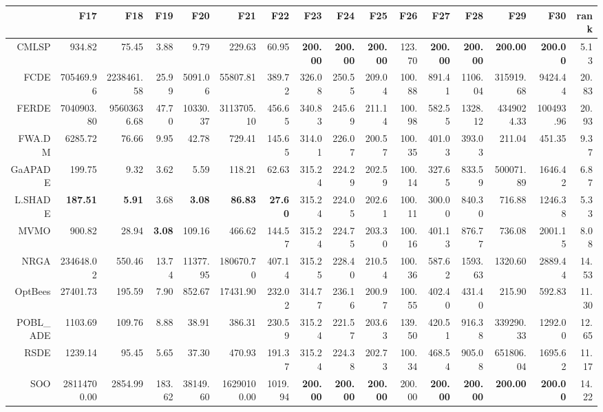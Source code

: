 \begin{table}[h!]
\centering
\begingroup\tiny
\begin{tabular}{rrrrrrrrrrrrrrrr}
  \hline
 & F17 & F18 & F19 & F20 & F21 & F22 & F23 & F24 & F25 & F26 & F27 & F28 & F29 & F30 & rank \\ 
  \hline
CMLSP & 934.82 & 75.45 & 3.88 & 9.79 & 229.63 & 60.95 & \textbf{200.00} & \textbf{200.00} & \textbf{200.00} & 123.70 & \textbf{200.00} & \textbf{200.00} & \textbf{200.00} & \textbf{200.00} & 5.13 \\ 
  FCDE & 705469.96 & 2238461.58 & 25.99 & 5091.06 & 55807.81 & 389.72 & 326.08 & 250.55 & 209.04 & 100.88 & 891.41 & 1106.04 & 315919.68 & 9424.44 & 20.83 \\ 
  FERDE & 7040903.80 & 95603636.68 & 47.70 & 10330.37 & 3113705.10 & 456.65 & 340.83 & 245.69 & 211.14 & 100.98 & 582.55 & 1328.12 & 4349024.33 & 100493.96 & 20.93 \\ 
  FWA.DM & 6285.72 & 76.66 & 9.95 & 42.78 & 729.41 & 145.65 & 314.01 & 226.07 & 200.57 & 100.35 & 401.03 & 393.03 & 211.04 & 451.35 & 9.37 \\ 
  GaAPADE & 199.75 & 9.32 & 3.62 & 5.59 & 118.21 & 62.63 & 315.24 & 224.29 & 202.59 & 100.14 & 327.65 & 833.59 & 500071.89 & 1646.42 & 6.87 \\ 
  L.SHADE & \textbf{187.51} & \textbf{5.91} & 3.68 & \textbf{3.08} & \textbf{86.83} & \textbf{27.60} & 315.24 & 224.05 & 202.61 & 100.11 & 300.00 & 840.30 & 716.88 & 1246.38 & 5.33 \\ 
  MVMO & 900.82 & 28.94 & \textbf{3.08} & 109.16 & 466.62 & 144.57 & 315.24 & 224.75 & 203.30 & 100.16 & 401.13 & 876.77 & 736.08 & 2001.15 & 8.08 \\ 
  NRGA & 234648.02 & 550.46 & 13.74 & 11377.95 & 180670.70 & 407.14 & 315.25 & 228.40 & 210.54 & 100.36 & 587.62 & 1593.63 & 1320.60 & 2889.44 & 14.53 \\ 
  OptBees & 27401.73 & 195.59 & 7.90 & 852.67 & 17431.90 & 232.02 & 314.77 & 236.16 & 200.97 & 100.55 & 402.40 & 431.40 & 215.90 & 592.83 & 11.30 \\ 
  POBL\_ADE & 1103.69 & 109.76 & 8.88 & 38.91 & 386.31 & 230.59 & 315.24 & 221.57 & 203.63 & 139.50 & 420.51 & 916.38 & 339290.33 & 1292.00 & 12.65 \\ 
  RSDE & 1239.14 & 95.45 & 5.65 & 37.30 & 470.93 & 191.37 & 315.24 & 224.38 & 202.73 & 100.34 & 468.54 & 905.08 & 651806.04 & 1695.62 & 11.17 \\ 
  SOO & 28114700.00 & 2854.99 & 183.62 & 38149.60 & 16290100.00 & 1019.94 & \textbf{200.00} & \textbf{200.00} & \textbf{200.00} & 200.00 & \textbf{200.00} & \textbf{200.00} & \textbf{200.00} & \textbf{200.00} & 14.22 \\ 

\end{tabular}
\end{table}
